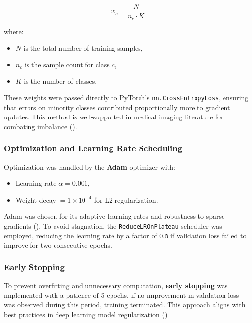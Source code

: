 \documentclass[
  12pt,
  oneside]{article}
\providecommand{\tightlist}{%
  \setlength{\itemsep}{0pt}\setlength{\parskip}{0pt}}
\begin{document}
\[
w_c = \frac{N}{n_c \cdot K}
\]

where:

\begin{itemize}
\tightlist
\item
  \(N\) is the total number of training samples,
\item
  \(n_c\) is the sample count for class \(c\),
\item
  \(K\) is the number of classes.
\end{itemize}

These weights were passed directly to PyTorch's
\texttt{nn.CrossEntropyLoss}, ensuring that errors on minority classes
contributed proportionally more to gradient updates. This method is
well-supported in medical imaging literature for combating imbalance
().

\subsubsection{Optimization and Learning Rate
Scheduling}\label{optimization-and-learning-rate-scheduling}

Optimization was handled by the \textbf{Adam} optimizer with:

\begin{itemize}
\tightlist
\item
  Learning rate \(\alpha = 0.001\),
\item
  Weight decay \(= 1\times 10^{-4}\) for L2 regularization.
\end{itemize}

Adam was chosen for its adaptive learning rates and robustness to sparse
gradients (). To avoid
stagnation, the \texttt{ReduceLROnPlateau} scheduler was employed,
reducing the learning rate by a factor of 0.5 if validation loss failed
to improve for two consecutive epochs.

\subsubsection{Early Stopping}\label{early-stopping}

To prevent overfitting and unnecessary computation, \textbf{early
stopping} was implemented with a patience of 5 epochs, if no improvement
in validation loss was observed during this period, training terminated.
This approach aligns with best practices in deep learning model
regularization ().
\end{document}
